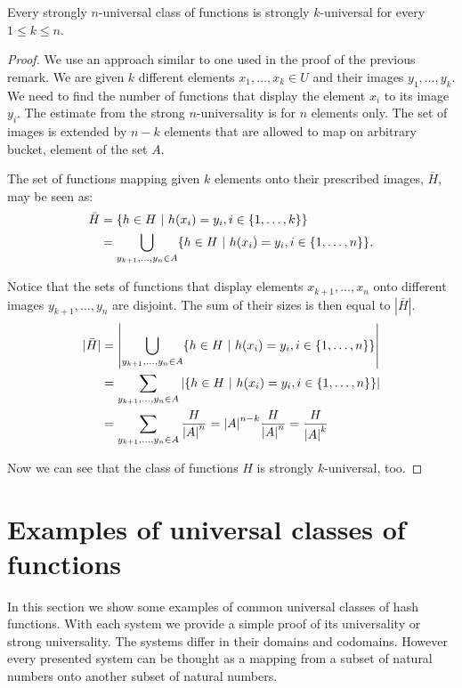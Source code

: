 \begin{remark}
Every strongly $n$-universal class of functions is strongly $k$-universal for every $1 \leq k \leq n$.
\end{remark}
\begin{proof}
We use an approach similar to one used in the proof of the previous remark. We are given $k$ different elements $x_1, \dots, x_k \in U$ and their images $y_1, \dots, y_k$. We need to find the number of functions that display the element $x_i$ to its image $y_i$. The estimate from the strong $n$-universality is for $n$ elements only. The set of images is extended by $n - k$ elements that are allowed to map on arbitrary bucket, element of the set $A$.

The set of functions mapping given $k$ elements onto their prescribed images, $\bar H$,  may be seen as:
\[
\begin{split}
\bar{H}	& = \lbrace h \in H \ | \  h(x_i) = y_i, i \in \lbrace 1, \dots, k \rbrace \rbrace \\
	& = \displaystyle \bigcup_{y_{k+1}, \dots, y_n \in A} \lbrace h \in H \ | \  h(x_i) = y_i, i \in \lbrace 1, \dots, n \rbrace \rbrace \textit{.}
\end{split}
\]

Notice that the sets of functions that display elements $x_{k + 1}, \dots, x_n$ onto different images $y_{k + 1}, \dots, y_n$ are disjoint. The sum of their sizes is then equal to $|\bar H|$.
\[
\begin{split}
|\bar H|& = \left| \displaystyle \bigcup_{y_{k+1}, \dots, y_n \in A} \lbrace h \in H \ | \  h(x_i) = y_i, i \in \lbrace 1, \dots, n \rbrace \rbrace \right| \\
	& = \displaystyle \sum_{y_{k+1}, \dots, y_n \in A} \left| \lbrace h \in H \ | \  h(x_i) = y_i, i \in \lbrace 1, \dots, n \rbrace \rbrace \right| \\
	& = \displaystyle \sum_{y_{k+1}, \dots, y_n \in A} \frac{H}{{|A|}^{n}} = {|A|}^{n - k} \frac{H}{{|A|}^{n}} = \frac{H}{{|A|}^{k}}
\end{split}
\]

Now we can see that the class of functions $H$ is strongly $k$-universal, too.
\end{proof}

\section{Examples of universal classes of functions}
In this section we show some examples of common universal classes of hash functions. With each system we provide a simple proof of its universality or strong universality. The systems differ in their domains and codomains. However every presented system can be thought as a mapping from a subset of natural numbers onto another subset of natural numbers.

